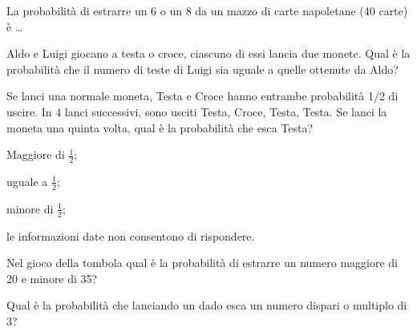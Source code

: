 \begin{esercizio} %
La probabilità di estrarre un 6 o un 8 da un mazzo di carte napoletane (40 carte) è \ldots
\end{esercizio}

\begin{esercizio} %
Aldo e Luigi giocano a testa o croce, ciascuno di essi lancia due monete. Qual è la probabilità che il numero di teste di Luigi sia uguale a quelle ottenute da Aldo?
\end{esercizio}

\begin{esercizio} %
Se lanci una normale moneta, Testa e Croce hanno entrambe probabilità 1/2 di uscire. In 4 lanci successivi, sono usciti Testa, Croce, Testa, Testa. Se lanci la moneta una quinta volta, qual è la probabilità che esca Testa?
\begin{itemize*}
\item Maggiore di $ \frac 1 2 $;
\item uguale a $ \frac 1 2 $;
\item minore di $ \frac 1 2 $;
\item le informazioni date non consentono di rispondere.
\end{itemize*}
\end{esercizio}

\begin{esercizio} %
Nel gioco della tombola qual è la probabilità di estrarre un numero maggiore di 20 e minore di 35?
\end{esercizio}

\begin{esercizio} %
Qual è la probabilità che lanciando un dado esca un numero dispari o multiplo di 3?
\end{esercizio}

